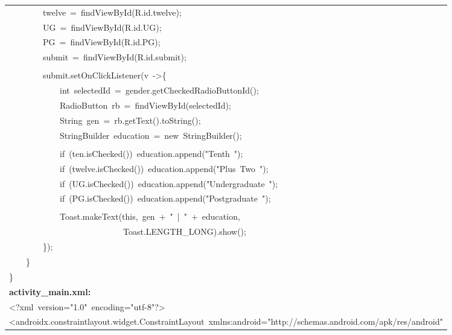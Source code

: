 \documentclass[a4paper,12pt]{article}
\begin{document}
\begin{longtable}{|p{}|}
{\ttfamily\small \ \ \ \ \ \ \ \ twelve\ =\ findViewById(R.id.twelve);} \\
{\ttfamily\small \ \ \ \ \ \ \ \ UG\ =\ findViewById(R.id.UG);} \\
{\ttfamily\small \ \ \ \ \ \ \ \ PG\ =\ findViewById(R.id.PG);} \\
{\ttfamily\small \ \ \ \ \ \ \ \ submit\ =\ findViewById(R.id.submit);} \\
\strut \\
{\ttfamily\small \ \ \ \ \ \ \ \ submit.setOnClickListener(v\ -\textgreater{}\{} \\
{\ttfamily\small \ \ \ \ \ \ \ \ \ \ \ \ int\ selectedId\ =\ gender.getCheckedRadioButtonId();} \\
{\ttfamily\small \ \ \ \ \ \ \ \ \ \ \ \ RadioButton\ rb\ =\ findViewById(selectedId);} \\
{\ttfamily\small \ \ \ \ \ \ \ \ \ \ \ \ String\ gen\ =\ rb.getText().toString();} \\
{\ttfamily\small \ \ \ \ \ \ \ \ \ \ \ \ StringBuilder\ education\ =\ new\ StringBuilder();} \\
\strut \\
{\ttfamily\small \ \ \ \ \ \ \ \ \ \ \ \ if\ (ten.isChecked())\ education.append("Tenth\ ");} \\
{\ttfamily\small \ \ \ \ \ \ \ \ \ \ \ \ if\ (twelve.isChecked())\ education.append("Plus\ Two\ ");} \\
{\ttfamily\small \ \ \ \ \ \ \ \ \ \ \ \ if\ (UG.isChecked())\ education.append("Undergraduate\ ");} \\
{\ttfamily\small \ \ \ \ \ \ \ \ \ \ \ \ if\ (PG.isChecked())\ education.append("Postgraduate\ ");} \\
\strut \\
{\ttfamily\small \ \ \ \ \ \ \ \ \ \ \ \ Toast.makeText(this,\ gen\ +\ "\ |\ "\ +\ education,\ } \\
{\ttfamily\small \ \ \ \ \ \ \ \ \ \ \ \ \ \ \ \ \ \ \ \ \ \ \ \ \ \ \ Toast.LENGTH\_LONG).show();} \\
{\ttfamily\small \ \ \ \ \ \ \ \ \});} \\
{\ttfamily\small \ \ \ \ \}} \\
{\ttfamily\small \}} \\
\hline
\rule{0pt}{13pt}\textbf{activity\_main.xml:} \\
\hline
{\ttfamily\small \textless{}?xml\ version="1.0"\ encoding="utf-8"?\textgreater{}} \\
{\ttfamily\small \textless{}androidx.constraintlayout.widget.ConstraintLayout\ xmlns:android="http://schemas.android.com/apk/res/android"} \\

\end{longtable}
\end{document}
